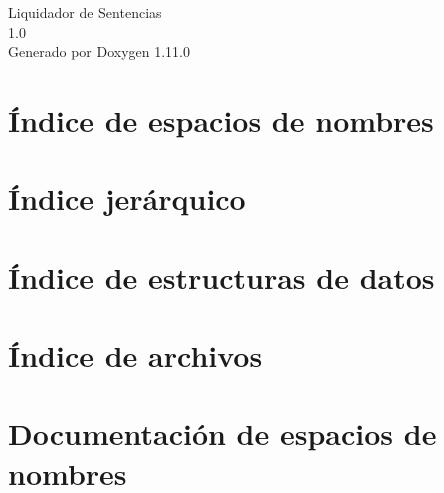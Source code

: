 \documentclass[twoside]{book}
\newcommand{\+}{\discretionary{\mbox{\scriptsize$\hookleftarrow$}}{}{}}
\newcommand{\clearemptydoublepage}{%
    \newpage{\pagestyle{empty}\cleardoublepage}%
  }
\begin{document}
  \raggedbottom
    \hypersetup{pageanchor=false,
                bookmarksnumbered=true,
                pdfencoding=unicode
               }
  \begin{titlepage}
  \vspace*{7cm}
  \begin{center}%
  {\Large Liquidador de Sentencias}\\
  [1ex]\large 1.\+0 \\
  \vspace*{1cm}
  {\large Generado por Doxygen 1.11.0}\\
  \end{center}
  \end{titlepage}
  \clearemptydoublepage
  \tableofcontents
  \clearemptydoublepage
  \hypersetup{pageanchor=true}

\chapter{Índice de espacios de nombres}

\chapter{Índice jerárquico}

\chapter{Índice de estructuras de datos}

\chapter{Índice de archivos}

\chapter{Documentación de espacios de nombres}

\end{document}

